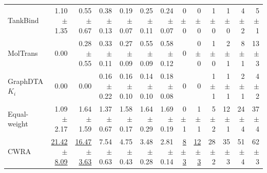 \begin{table}[htbp!]
\begin{tabular}{lrrrrrr|rrrrrr}
TankBind & 1.10$\pm$1.35 & 0.55$\pm$0.67 & 0.38$\pm$0.13 & 0.19$\pm$0.07 & 0.25$\pm$0.11 & 0.24$\pm$0.07 & 0$\pm$0 & 0$\pm$0 & 1$\pm$0 & 1$\pm$0 & 4$\pm$2 & 5$\pm$1 \\
MolTrans & 0.00 & 0.28$\pm$0.55 & 0.33$\pm$0.11 & 0.27$\pm$0.09 & 0.55$\pm$0.09 & 0.58$\pm$0.12 & 0 & 0$\pm$0 & 1$\pm$0 & 2$\pm$1 & 8$\pm$1 & 13$\pm$3 \\
GraphDTA $K_{i}$ & 0.00 & 0.00 & 0.16$\pm$0.22 & 0.16$\pm$0.10 & 0.14$\pm$0.10 & 0.18$\pm$0.08 & 0 & 0 & 1$\pm$1 & 1$\pm$1 & 2$\pm$1 & 4$\pm$2 \\
\midrule
Equal-weight & 1.09$\pm$2.17 & 1.64$\pm$1.59 & 1.37$\pm$0.67 & 1.58$\pm$0.17 & 1.64$\pm$0.29 & 1.69$\pm$0.19 & 0$\pm$1 & 1$\pm$1 & 5$\pm$2 & 12$\pm$1 & 24$\pm$4 & 37$\pm$4 \\
CWRA & \underline{21.42$\pm$8.09} & \underline{16.47$\pm$3.63} & 7.54$\pm$0.63 & 4.75$\pm$0.43 & 3.48$\pm$0.28 & 2.81$\pm$0.14 & \underline{8$\pm$3} & \underline{12$\pm$3} & 28$\pm$2 & 35$\pm$3 & 51$\pm$4 & 62$\pm$3 \\
\bottomrule
\end{tabular}
\end{table}
